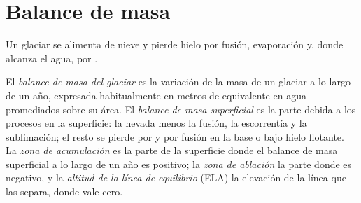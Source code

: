 \section{Balance de masa}\label{sec:b3:glaciology:mass-balance}

Un glaciar se alimenta de nieve y pierde hielo por fusión, evaporación y, donde
alcanza el agua, por .

\begin{definition}\label{def:b3:glaciology:mass-balance}
El \emph{balance de masa del glaciar} es la variación
de la masa de un glaciar a lo largo de un año, expresada habitualmente en metros de
equivalente en agua promediados sobre su área. El \emph{balance de masa
superficial} es la parte debida a los procesos en
la superficie: la nevada menos la fusión, la escorrentía y la sublimación; el resto se
pierde por  y por fusión en la base o bajo hielo flotante. La
\emph{zona de acumulación} es la parte de la
superficie donde el balance de masa superficial a lo largo de un año es positivo; la
\emph{zona de ablación} la parte donde es negativo,
y la \emph{altitud de la línea de equilibrio}
(ELA) la elevación de la línea que las separa, donde vale cero.
\end{definition}

